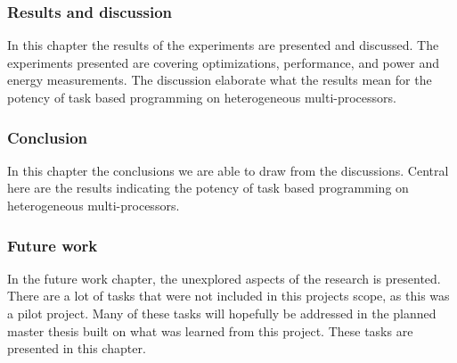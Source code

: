 \subsubsection{Results and discussion}
In this chapter the results of the experiments are presented and discussed.
The experiments presented are covering optimizations, performance, and power and energy measurements.
The discussion elaborate what the results mean for the potency of task based programming on heterogeneous multi-processors.

\subsubsection{Conclusion}
In this chapter the conclusions we are able to draw from the discussions.
Central here are the results indicating the potency of task based programming on heterogeneous multi-processors.

\subsubsection{Future work}
In the future work chapter, the unexplored aspects of the research is presented.
There are a lot of tasks that were not included in this projects scope, as this was a pilot project.
Many of these tasks will hopefully be addressed in the planned master thesis built on what was learned from this project.
These tasks are presented in this chapter.

